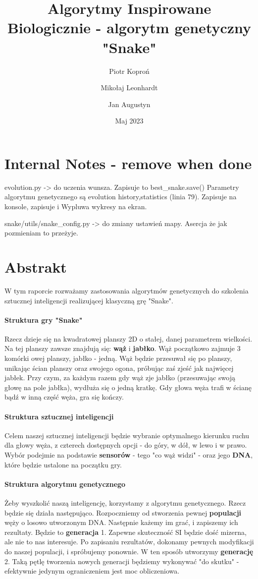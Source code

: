 \documentclass{article}
\author{Piotr Koproń \and Mikołaj Leonhardt \and Jan Augustyn}
\date{Maj 2023}
\title{Algorytmy Inspirowane Biologicznie - algorytm genetyczny "Snake"}
\begin{document}
\maketitle
\newpage
\section{Internal Notes - remove when done}
evolution.py -> do uczenia wunsza. Zapisuje to best\_snake.save()
Parametry algorytmu genetycznego są evolution history,statistics (linia 79).
Zapisuje na konsole, zapisuje i Wypluwa wykresy na ekran.

snake/utils/snake_config.py -> do zmiany ustawień mapy. Asercja że jak pozmieniam to przeżyje.
\section{Abstrakt}
W tym raporcie rozważamy zastosowania algorytmów genetycznych do szkolenia sztucznej inteligencji realizującej klasyczną grę "Snake".
\paragraph{Struktura gry "Snake"}
Rzecz dzieje się na kwadratowej planszy 2D o stałej, danej parametrem wielkości. Na tej planszy zawsze znajdują się: \textbf{wąż} i \textbf{jabłko}. Wąż początkowo zajmuje 3 komórki owej planszy, jabłko - jedną. Wąż będzie przesuwał się po planszy, unikając ścian planszy oraz swojego ogona, próbując zaś zjeść jak najwięcej jabłek. Przy czym, za każdym razem gdy wąż zje jabłko (przesuwając swoją głowę na pole jabłka), wydłuża się o jedną kratkę.
Gdy głowa węża trafi w ścianę bądź w  inną część węża, gra się kończy.
\paragraph{Struktura sztucznej inteligencji}
Celem naszej sztucznej inteligencji będzie wybranie optymalnego kierunku ruchu dla głowy węża, z czterech dostępnych opcji - do góry, w dół, w lewo i w prawo. Wybór podejmie na podstawie \textbf{sensorów} - tego "co wąż widzi" - oraz jego \textbf{DNA}, które będzie ustalone na początku gry.
\paragraph{Struktura algorytmu genetycznego}
Żeby wyszkolić naszą inteligencję, korzystamy z algorytmu genetycznego. Rzecz będzie się działa następująco.
Rozpoczniemy od stworzenia pewnej \textbf{populacji} węży o losowo utworzonym DNA. Następnie każemy im grać, i zapiszemy ich rezultaty. Będzie to \textbf{generacja} 1. Zapewne skuteczność SI będzie dość mizerna, ale nie to nas interesuje. Po zapisaniu rezultatów, dokonamy pewnych modyfikacji do naszej populacji, i spróbujemy ponownie. W ten sposób utworzymy \textbf{generację} 2. Taką pętlę tworzenia nowych generacji będziemy wykonywać "do skutku" - efektywnie jedynym ograniczeniem jest moc obliczeniowa. 
\end{document}
